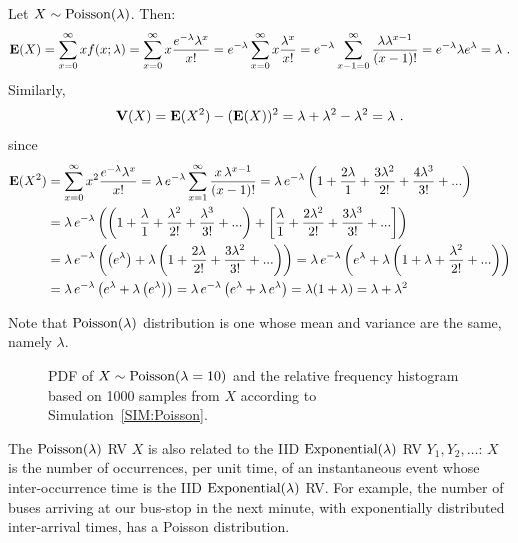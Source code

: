 \begin{example}\label{EgMeanAndVarOfPoisson}
Let $X \sim \mbox{{\rm Poisson}}(\lambda)$.  Then:
\[
\mathbf{E}(X) = \sum_{x=0}^{\infty} x f(x;\lambda)
= \sum_{x =0}^{\infty} x \frac{ e^{-\lambda} \lambda^x}{x!}
= e^{-\lambda} \sum_{x =0}^{\infty} x \frac{  \lambda^x}{x!}
= e^{-\lambda} \sum_{x -1 =0}^{\infty} \frac{ \lambda \lambda^{x-1}}{(x-1)!}
= e^{-\lambda} \lambda e^{\lambda}
= \lambda
\ .
\]
Similarly,
\[
\V(X) = \e(X^2)-(\e(X))^2 = \lambda + \lambda^2 - \lambda^2 = \lambda \ .
\]
since
\begin{align*}
\mathbf{E}(X^2)& = \sum_{x=0}^{\infty} x^2 \frac{e^{-\lambda} \lambda^x}{x!} = \lambda \, e^{-\lambda} \sum_{x=1}^{\infty} \frac{x \, \lambda^{x-1}}{(x-1)!}
= \lambda \, e^{-\lambda} \left( 1 + \frac{2 \lambda}{1} + \frac{3 \lambda^2}{2!} + \frac{4 \lambda^3}{3!} + ... \right)\\
&= \lambda \, e^{-\lambda} \left( \left( 1 + \frac{\lambda}{1} + \frac{\lambda^2}{2!} + \frac{\lambda^3}{3!} + ... \right) + \left[ \frac{\lambda}{1} + \frac{2 \lambda^2}{2!} + \frac{3 \lambda^3}{3!} + ... \right] \right)\\
&= \lambda \, e^{-\lambda} \left( \left( e^{\lambda} \right) + \lambda \left( 1 + \frac{2 \lambda}{2!} + \frac{3 \lambda^2}{3!} + ... \right) \right)
= \lambda \, e^{-\lambda} \left( e^{\lambda} + \lambda \left( 1 + \lambda + \frac{\lambda^2}{2!} + ... \right) \right)\\
&= \lambda \, e^{-\lambda} \left( e^{\lambda} + \lambda \left( e^{\lambda} \right) \right)
= \lambda \, e^{-\lambda} \left( e^{\lambda} + \lambda\, e^{\lambda}\right) = \lambda (1 + \lambda) = \lambda + \lambda^2
\end{align*}

Note that $\mbox{{\rm Poisson}}(\lambda)$ distribution is one whose mean and variance are the same, namely $\lambda$.
\end{example}

\begin{figure}[htpb]
\caption{PDF of $X \sim \mbox{{\rm Poisson}}(\lambda=10)$ and the relative frequency histogram based on 1000 samples from $X$ according to Simulation~\ref{SIM:Poisson}.\label{F:PlotPdfSim1000HistPoiss10}}
\centering   {}
\end{figure}

The $\mbox{{\rm Poisson}}(\lambda)$ RV $X$ is also related to the IID $\mbox{{\rm Exponential}}(\lambda)$ RV $Y_1,Y_2,\ldots$: $X$ is the number of occurrences, per unit time, of an instantaneous event whose inter-occurrence time is the IID $\mbox{{\rm Exponential}}(\lambda)$ RV.  For example, the number of buses arriving at our bus-stop in the next minute, with exponentially distributed inter-arrival times, has a Poisson distribution.

